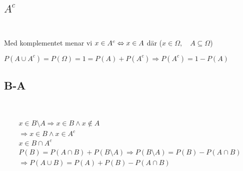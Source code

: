 \subsection{$A^c$}\hfill\\
\par
\noindent Med komplementet menar vi $x\in A^c\Leftrightarrow x\in A$ där ($x\in\Omega,\quad A\subseteq\Omega$)
\par\bigskip
\noindent $P\left(A\cup A^c\right) = P(\Omega) = 1 = P(A)+P(A^c)\Rightarrow P(A^c)=1-P(A)$
\par\bigskip
\subsection{B-A}\hfill\\\par

\begin{equation*}
  \begin{gathered}
    x\in B\setminus A\Rightarrow x\in B \wedge x\notin A\\
    \Rightarrow x\in B \wedge x\in A^c\\
    x\in B\cap A^c\\
    P(B) = P(A\cap B)+P(B\setminus A)\Rightarrow P(B\setminus A) = P(B)-P(A\cap B)\\
    \Rightarrow P(A\cup B) = P(A)+P(B)-P(A\cap B)
  \end{gathered}
\end{equation*}
